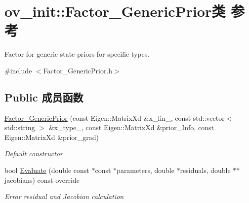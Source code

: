 \hypertarget{classov__init_1_1Factor__GenericPrior}{}\section{ov\+\_\+init\+:\+:Factor\+\_\+\+Generic\+Prior类 参考}
\label{classov__init_1_1Factor__GenericPrior}


Factor for generic state priors for specific types.  




{\ttfamily \#include $<$Factor\+\_\+\+Generic\+Prior.\+h$>$}

\subsection*{Public 成员函数}
\begin{DoxyCompactItemize}
\item 
\mbox{\label{classov__init_1_1Factor__GenericPrior_a9f3839a153e85d5836b12eaa68f3d565}} 
\hyperlink{classov__init_1_1Factor__GenericPrior_a9f3839a153e85d5836b12eaa68f3d565}{Factor\+\_\+\+Generic\+Prior} (const Eigen\+::\+Matrix\+Xd \&x\+\_\+lin\+\_\+, const std\+::vector$<$ std\+::string $>$ \&x\+\_\+type\+\_\+, const Eigen\+::\+Matrix\+Xd \&prior\+\_\+\+Info, const Eigen\+::\+Matrix\+Xd \&prior\+\_\+grad)
\begin{DoxyCompactList}\small\item\em Default constructor \end{DoxyCompactList}\item 
\mbox{\label{classov__init_1_1Factor__GenericPrior_aba62008b7e579108e0cc05ef182f033c}} 
bool \hyperlink{classov__init_1_1Factor__GenericPrior_aba62008b7e579108e0cc05ef182f033c}{Evaluate} (double const $\ast$const $\ast$parameters, double $\ast$residuals, double $\ast$$\ast$jacobians) const override
\begin{DoxyCompactList}\small\item\em Error residual and Jacobian calculation \end{DoxyCompactList}\end{DoxyCompactItemize}
